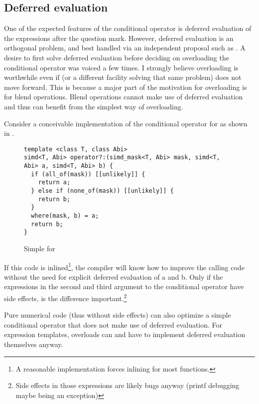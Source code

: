 \subsection{Deferred evaluation}
One of the expected features of the conditional operator is deferred evaluation of the expressions after the question mark.
However, deferred evaluation is an orthogonal problem, and best handled via an independent proposal such as \cite{P0927R2}.
A desire to first solve deferred evaluation before deciding on overloading the conditional operator was voiced a few times.
I strongly believe  overloading is worthwhile even if \cite{P0927R2} (or a different facility solving that same problem) does not move forward.
This is because a major part of the motivation for  overloading is for blend operations.
Blend operations cannot make use of deferred evaluation and thus can benefit from the simplest way of  overloading.

Consider a conceivable implementation of the conditional operator for  as shown in .
\begin{figure}[bht]
\begin{lstlisting}[style=Vc]
template <class T, class Abi>
simd<T, Abi> operator?:(simd_mask<T, Abi> mask, simd<T, Abi> a, simd<T, Abi> b) {
  if (all_of(mask)) [[unlikely]] {
    return a;
  } else if (none_of(mask)) [[unlikely]] {
    return b;
  }
  where(mask, b) = a;
  return b;
}
\end{lstlisting}
\caption{Simple  for }
  \label{fig:simd ?:}
\end{figure}
If this code is inlined\footnote{A reasonable  implementation forces inlining for most functions.}, the compiler will know how to improve the calling code without the need for explicit deferred evaluation of \code a and \code b.
Only if the expressions in the second and third argument to the conditional operator have side effects, is the difference important.\footnote{Side effects in those expressions are likely bugs anyway (printf debugging maybe being an exception)}

Pure numerical code (thus without side effects) can also optimize a simple conditional operator that does not make use of deferred evaluation.
For expression templates,  overloads can and have to implement deferred evaluation themselves anyway.


